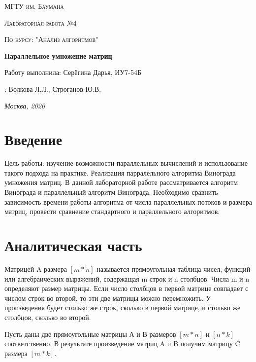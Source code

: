 \documentclass[12pt]{report}
\begin{document}
\begin{titlepage}
	\centering
	{\scshape\LARGE МГТУ им. Баумана \par}
	\vspace{3cm}
	{\scshape\Large Лабораторная работа №4\par}
	\vspace{0.5cm}	
	{\scshape\Large По курсу: "Анализ алгоритмов"\par}
	\vspace{1.5cm}
	{\huge\bfseries Параллельное умножение матриц\par}
	\vspace{2cm}
	\Large Работу выполнила: Серёгина Дарья, ИУ7-54Б\par
	\vspace{0.5cm}
	:  Волкова Л.Л., Строганов Ю.В.\par

	\vfill
	\large \textit {Москва, 2020} \par
\end{titlepage}

\tableofcontents

\newpage
\chapter*{Введение}
Цель работы: изучение возможности параллельных вычислений и использование такого подхода на практике. Реализация парралельного алгоритма Винограда умножения матриц. В данной лабораторной работе рассматривается алгоритм Винограда и параллельный алгоритм Винограда. Необходимо сравнить зависимость времени работы алгоритма от числа параллельных потоков и размера матриц, провести сравнение стандартного и параллельного алгоритмов.



\chapter{Аналитическая часть}
Матрицей A размера $[m*n]$ называется прямоугольная таблица
чисел, функций или алгебраических выражений, содержащая m строк и n столбцов. Числа m и n определяют размер матрицы.\cite{Beloysov} Если число столбцов в первой матрице совпадает с числом строк во второй, то эти две матрицы можно перемножить. У произведения будет столько же строк, сколько в первой матрице, и столько же столбцов, сколько во второй.
	    
Пусть даны две прямоугольные матрицы А и В размеров $[m * n]$ и $[n * k]$ соответственно.  
В результате произведение матриц A и B получим матрицу C размера $[m *  k]$.
\end{document}

